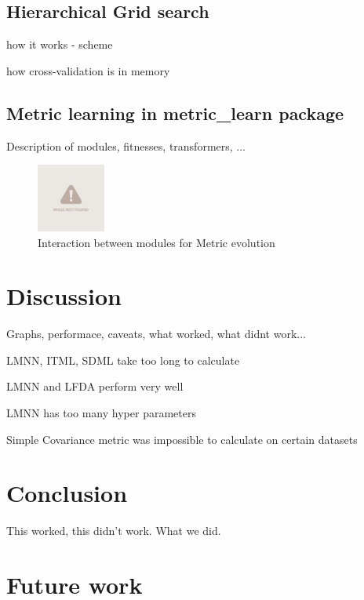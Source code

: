 \documentclass[12pt,a4paper]{report}
\begin{document}
\section{Hierarchical Grid search}

how it works - scheme

how cross-validation is in memory

\section{Metric learning in metric\_learn package}

Description of modules, fitnesses, transformers, ...

\begin{figure}[h!] \label{fig:implementation-modules}
	\centering
    \includegraphics[width=0.2\textwidth]{img/notfound}
    \caption{Interaction between modules for Metric evolution}
\end{figure}


\chapter{Discussion}

Graphs, performace, caveats, what worked, what didnt work...

LMNN, ITML, SDML take too long to calculate

LMNN and LFDA perform very well

LMNN has too many hyper parameters

Simple Covariance metric was impossible to calculate on certain datasets


\chapter*{Conclusion}

This worked, this didn't work. What we did.

\chapter*{Future work}
\end{document}
